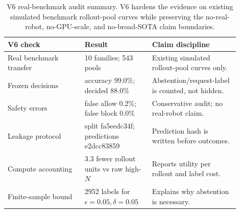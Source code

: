 \begin{table}[t]
\centering
\small
\begin{tabular}{p{0.30\linewidth}p{0.26\linewidth}p{0.34\linewidth}}
\toprule
V6 check & Result & Claim discipline \\
\midrule
Real benchmark transfer & 10 families; 543 pools & Existing simulated rollout-pool curves only. \\
Frozen decisions & accuracy 99.0\%; decided 88.0\% & Abstention/request-label is counted, not hidden. \\
Safety errors & false allow 0.2\%; false block 0.0\% & Conservative audit; no real-robot claim. \\
Leakage protocol & split fa5eedc34f; predictions e2dcc83859 & Prediction hash is written before outcomes. \\
Compute accounting & 3.3 fewer rollout units vs raw high-$N$ & Reports utility per rollout and label cost. \\
Finite-sample bound & 2952 labels for $\epsilon=0.05,\delta=0.05$ & Explains why abstention is necessary. \\
\bottomrule
\end{tabular}
\caption{V6 real-benchmark audit summary. V6 hardens the evidence on existing simulated benchmark rollout-pool curves while preserving the no-real-robot, no-GPU-scale, and no-broad-SOTA claim boundaries.}
\label{tab:v6-summary}
\end{table}

